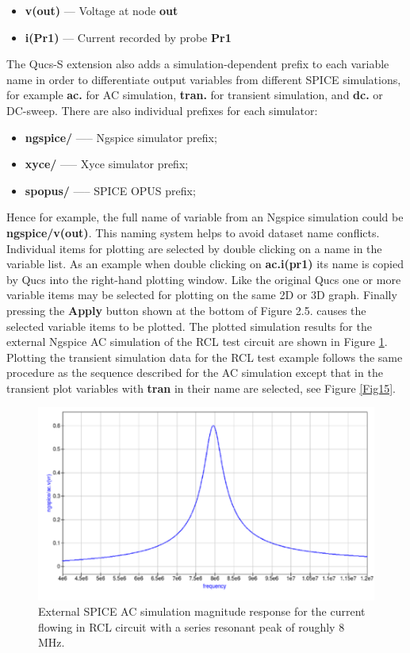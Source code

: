 \documentclass[10pt, a4paper]{report}
\begin{document}
\begin{itemize}
	\item {\textbf{v(out)} --- Voltage at node \textbf{out} }
	\item {\textbf{i(Pr1)} --- Current recorded by probe \textbf{Pr1} }
\end{itemize}

\noindent The Qucs-S extension also adds a simulation-dependent prefix to each variable name in order to differentiate output variables from different SPICE simulations, for example \textbf{ac.} for AC simulation, \textbf{tran.} for transient simulation, and \textbf{ dc.} or DC-sweep. There are also individual prefixes for each simulator:
\begin{itemize}
	\item {\textbf{ngspice/} ----- Ngspice simulator prefix; }
	\item {\textbf{xyce/}    ----- Xyce simulator prefix; }
    \item {\textbf{spopus/}  ----- SPICE OPUS prefix; }
\end{itemize}
 
\noindent Hence for example, the full name of variable from an Ngspice simulation could be \textbf{ ngspice/v(out)}.
This naming system helps to avoid dataset name conflicts. Individual items for plotting are selected by double clicking on a name in the variable list. As an example when double clicking on \textbf{ac.i(pr1)} its name is copied by Qucs into the right-hand plotting window.  Like the original Qucs one or more variable items may be selected for plotting on the same 2D or 3D graph. Finally pressing the \textbf{Apply} button shown at the bottom of Figure 2.5. causes the selected variable items to be plotted. The plotted simulation results for the external Ngspice AC simulation of the RCL test circuit are shown in Figure \ref{Fig14}. Plotting the transient simulation data for the RCL test example follows the same procedure as the sequence described for the AC simulation except that in the transient plot variables with\textbf{ tran} in their name are selected, see Figure \ref{Fig15}.
 \begin{figure}[h]
	\centering
	\includegraphics[width=12cm]{pics/chap2/RCL_ac.pdf}
	\caption{ External SPICE AC simulation magnitude response for the current flowing in
    RCL circuit with a series resonant peak of roughly 8 MHz.  }
	\label{Fig14}
\end{figure}
\end{document}
